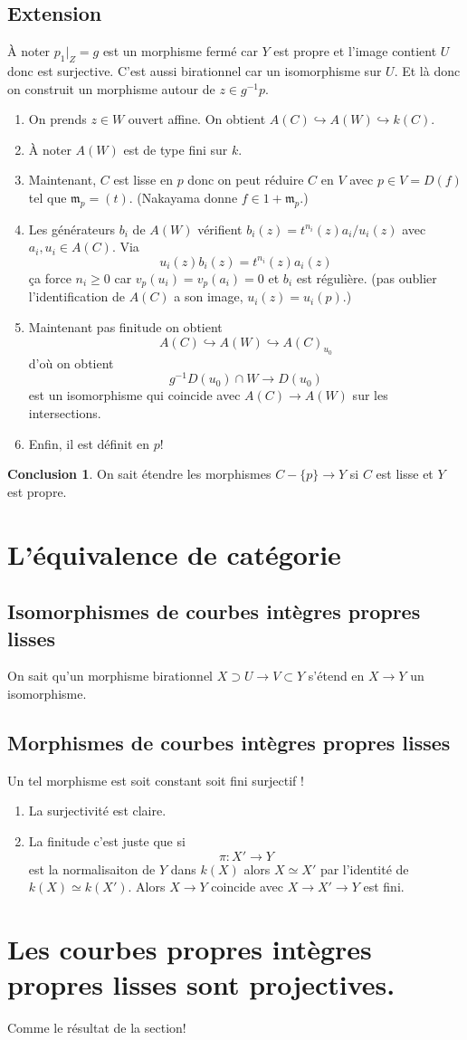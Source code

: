 \documentclass[a4paper,12pt]{book}
\newcommand{\m}{\mathfrak{m}}
\theoremstyle{plain}
\theoremstyle{definition}
\newtheorem{concl}{Conclusion}
\theoremstyle{remark}
\begin{document}
\subsection{Extension}
À noter $p_1|_Z=g$ est un morphisme fermé car $Y$ est propre et
l'image contient $U$ donc est surjective. C'est aussi 
birationnel car un isomorphisme sur $U$. Et là donc on
construit un morphisme autour de $z\in g^{-1} p$.  
\begin{enumerate}
  \item On prends $z\in W$ ouvert affine. On obtient
    $A(C)\hookrightarrow A(W)\hookrightarrow k(C)$.
  \item À noter $A(W)$ est de type fini sur $k$. 
  \item Maintenant, $C$ est lisse en $p$ donc on peut réduire
  $C$ en $V$ avec $p\in V=D(f)$ tel que $\m_p=(t)$. (Nakayama
  donne $f\in 1+\m_p$.)
  \item Les générateurs $b_i$ de $A(W)$ vérifient 
    $b_i(z)=t^{n_i}(z)a_i/u_i(z)$ avec $a_i,u_i\in A(C)$.
    Via 
    \[u_i(z)b_i(z)=t^{n_i}(z)a_i(z)\]
    ça force $n_i\geq 0$ car $v_p(u_i)=v_p(a_i)=0$
    et $b_i$ est régulière.
    (pas oublier l'identification de $A(C)$ a son 
    image, $u_i(z)=u_i(p)$.)
  \item Maintenant pas finitude on obtient
    \[A(C)\hookrightarrow A(W)\hookrightarrow A(C)_{u_0}\]
    d'où on obtient \[g^{-1}D(u_0)\cap W\to D(u_0)\]
    est un isomorphisme qui coincide avec $A(C)\to A(W)$
    sur les intersections.
  \item Enfin, il est définit en $p$!
\end{enumerate}

\begin{concl}
  On sait étendre les morphismes $C-\{p\} \to Y$ 
  si $C$ est lisse et $Y$ est propre.
\end{concl}
\section{L'équivalence de catégorie}
\subsection{Isomorphismes de courbes intègres propres lisses}
On sait qu'un morphisme birationnel $X\supset U\to V\subset Y$
s'étend en $X\to Y$ un isomorphisme.

\subsection{Morphismes de courbes intègres propres lisses}
Un tel morphisme est soit constant soit fini surjectif ! 
\begin{enumerate}
  \item La surjectivité est claire.
  \item La finitude c'est juste que si
    \[\pi \colon X'\to Y\]
    est la normalisaiton de $Y$ dans $k(X)$ alors
    $X\simeq X'$ par l'identité de $k(X)\simeq k(X')$.
    Alors $X\to Y$ coincide avec $X\to X'\to Y$ est fini.
\end{enumerate}

\section{Les courbes propres intègres propres lisses sont projectives.}
Comme le résultat de la section!




\printbibliography
\end{document}
